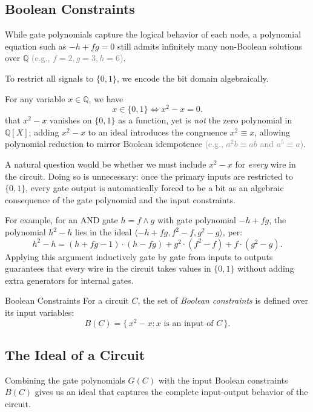 \documentclass[a4paper, 11pt]{report}
\begin{document}
\subsection{Boolean Constraints}

While gate polynomials capture the logical behavior of each node, a polynomial equation such as $-h + fg = 0$ still admits infinitely many non-Boolean solutions over $\mathbb{Q}$ \textcolor{gray}{(e.g., $f = 2, g = 3, h = 6$)}. 

To restrict all signals to $\{0,1\}$, we encode the bit domain algebraically.

For any variable $x \in \mathbb{Q}$, we have
$$
    x \in \{0,1\} \iff x^2 - x = 0.
$$
that $x^2 - x$ vanishes on $\{0,1\}$ as a function, yet is \emph{not} the zero polynomial in $\mathbb{Q}[X]$; adding $x^2 - x$ to an ideal introduces the congruence $x^2 \equiv x$, allowing polynomial reduction to mirror Boolean idempotence \textcolor{gray}{(e.g., $a^2b \equiv ab$ and $a^5 \equiv a$)}.

A natural question would be whether we must include $x^2 - x$ for \emph{every} wire in the circuit. Doing so is unnecessary: once the primary inputs are restricted to $\{0,1\}$, every gate output is automatically forced to be a bit as an algebraic consequence of the gate polynomial and the input constraints.

For example, for an AND gate $h = f \wedge g$ with gate polynomial $-h + fg$, the polynomial $h^2 - h$ lies in the ideal $\langle -h + fg, f^2 - f, g^2 - g \rangle$, per:
$$
    h^2 - h = (h + fg - 1)\cdot(h - fg) + g^2\cdot(f^2 - f) + f\cdot(g^2 - g).
$$
Applying this argument inductively gate by gate from inputs to outputs guarantees that every wire in the circuit takes values in $\{0,1\}$ without adding extra generators for internal gates.

\begin{defframe}{Boolean Constraints}{}
For a circuit $C$, the set of \emph{Boolean constraints} is defined over its input variables:
$$
    B(C) = \{\, x^2 - x : x \text{ is an input of } C \,\}.
$$
\end{defframe}

\subsection{The Ideal of a Circuit}
Combining the gate polynomials $G(C)$ with the input Boolean constraints $B(C)$ gives us an ideal that captures the complete input-output behavior of the circuit.
\end{document}
